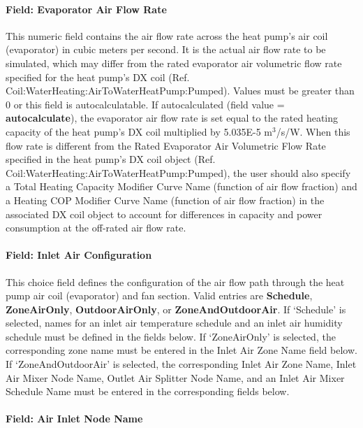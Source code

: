 \paragraph{Field: Evaporator Air Flow Rate}\label{field-evaporator-air-flow-rate}

This numeric field contains the air flow rate across the heat pump's air coil (evaporator) in cubic meters per second. It is the actual air flow rate to be simulated, which may differ from the rated evaporator air volumetric flow rate specified for the heat pump's DX coil (Ref. Coil:WaterHeating:AirToWaterHeatPump:Pumped). Values must be greater than 0 or this field is autocalculatable. If autocalculated (field value = \textbf{autocalculate}), the evaporator air flow rate is set equal to the rated heating capacity of the heat pump's DX coil multiplied by 5.035E-5 m\(^{3}\)/s/W. When this flow rate is different from the Rated Evaporator Air Volumetric Flow Rate specified in the heat pump's DX coil object (Ref. Coil:WaterHeating:AirToWaterHeatPump:Pumped), the user should also specify a Total Heating Capacity Modifier Curve Name (function of air flow fraction) and a Heating COP Modifier Curve Name (function of air flow fraction) in the associated DX coil object to account for differences in capacity and power consumption at the off-rated air flow rate.

\paragraph{Field: Inlet Air Configuration}\label{field-inlet-air-configuration}

This choice field defines the configuration of the air flow path through the heat pump air coil (evaporator) and fan section. Valid entries are \textbf{Schedule}, \textbf{ZoneAirOnly}, \textbf{OutdoorAirOnly}, or \textbf{ZoneAndOutdoorAir}. If `Schedule' is selected, names for an inlet air temperature schedule and an inlet air humidity schedule must be defined in the fields below. If `ZoneAirOnly' is selected, the corresponding zone name must be entered in the Inlet Air Zone Name field below. If `ZoneAndOutdoorAir' is selected, the corresponding Inlet Air Zone Name, Inlet Air Mixer Node Name, Outlet Air Splitter Node Name, and an Inlet Air Mixer Schedule Name must be entered in the corresponding fields below.

\paragraph{Field: Air Inlet Node Name}\label{field-air-inlet-node-name-008}

